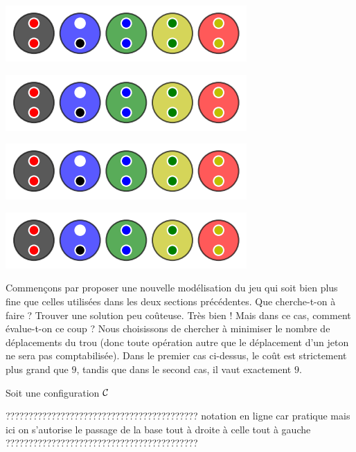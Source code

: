 \begin{multicols}{2}
\begin{center}
		\includegraphics[scale= 0.45]{content/optimal/wheredowego/algo_bubble/000.png}

		\includegraphics[scale= 0.45]{content/optimal/wheredowego/algo_bubble/000.png}

		\includegraphics[scale= 0.45]{content/optimal/wheredowego/algo_bubble/000.png}

		\includegraphics[scale= 0.45]{content/optimal/wheredowego/algo_bubble/000.png}
	\end{center}
\end{multicols}


\medskip

Commençons par proposer une nouvelle modélisation du jeu qui soit bien plus fine que celles utilisées dans les deux sections précédentes. 
Que cherche-t-on à faire ? Trouver une solution peu coûteuse. Très bien ! Mais dans ce cas, comment évalue-t-on ce coup ? Nous choisissons de chercher à minimiser le nombre de déplacements du trou (donc toute opération autre que le déplacement d'un jeton ne sera pas comptabilisée).
Dans le premier cas ci-dessus, le coût est strictement plus grand que $9$, tandis que dans le second cas, il vaut exactement $9$. 


\medskip

Soit une configuration $\cal C$

??????????????????????????????????????????
notation en ligne car pratique mais ici on s'autorise le passage de la base tout à droite à celle tout à gauche
??????????????????????????????????????????

